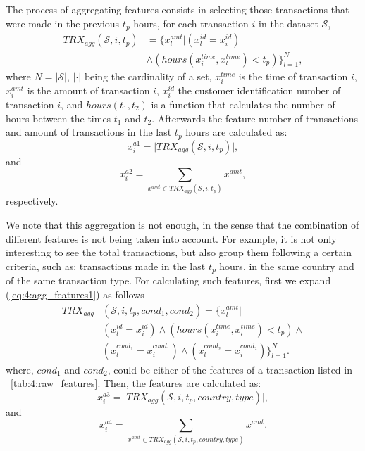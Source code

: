   The process of aggregating features consists in  selecting those transactions that were made in 
  the previous $t_p$ hours, for each transaction $i$ in the dataset $\mathcal{S}$,
	\begin{align}\label{eq:4:agg_features1}
		TRX_{agg}(\mathcal{S},i, t_p) &= \bigg\{x_l^{amt} \bigg\vert 
\left(x_l^{id}=x_i^{id}\right) \nonumber \\
		&\wedge \left(hours(x_i^{time},x_l^{time}) < t_p\right) \bigg\}_{l=1}^N,
	\end{align}
  where $N=\vert\mathcal{S}\vert$, $\vert \cdot \vert$ being the cardinality of a set, $x_i^{time}$ 
  is the time of transaction $i$,  $x_i^{amt}$ is the amount of transaction $i$, $x_i^{id}$  the 
  customer identification number of transaction $i$, and $hours(t_1,t_2)$ is  a function that 
  calculates the number of hours between the times $t_1$  and $t_2$. Afterwards the feature number 
  of transactions and amount of transactions in the last $t_p$ hours are calculated as:
  \begin{equation}\label{eq:4:agg1a}
    x_i^{a1} = \vert TRX_{agg}(\mathcal{S},i, t_p) \vert ,
  \end{equation}
  and   
  \begin{equation}\label{eq:4:agg1b}
  x_i^{a2} = \sum_{x^{amt} \in   TRX_{agg}(\mathcal{S},i, t_p)} x^{ amt},
  \end{equation}
  respectively.
	
  We note that this aggregation is not enough, in the sense that the combination 
  of  different features is not being taken into account. For example, it is not only 
  interesting   to see the total transactions, but also group them following a certain criteria, 
  such as: transactions   made in the last $t_p$ hours, in the same country   and of the same 
  transaction type. For   calculating such features, first we expand (\ref{eq:4:agg_features1}) as 
  follows
	\begin{align}\label{eq:4:agg_features2}
		TRX_{agg}&(\mathcal{S}  ,i, t_p, cond_1, cond_2) = \bigg\{ x_l^{amt} \bigg\vert \nonumber \\  
		& \left(x_l^{id}=x_i^{id}\right) \wedge  \left(hours(x_i^{time},x_l^{time})<  t_p\right) 
    \wedge \nonumber \\ 	
    &  \left(x_l^{cond_1} = x_i^{cond_1}\right) \wedge	\left(x_l^{cond_2} = 
		x_i^{cond_2}\right) \bigg\}_{l=1}^N.
		\end{align}
  where, $cond_1$ and $cond_2$, could be either of the features of a transaction listed in 
  \tablename{~\ref{tab:4:raw_features}}. Then, the features are calculated as:
  \begin{equation}\label{eq:4:agg2a}
     x_i^{a3} = \vert TRX_{agg}(\mathcal{S},i, t_p, country, type) \vert ,
  \end{equation}
  and   
  \begin{equation}\label{eq:4:agg2b}
  x_i^{a4} = \sum_{x^{amt} \in   TRX_{agg}(\mathcal{S},i, t_p,country, type)} x^{ amt}.
  \end{equation}

